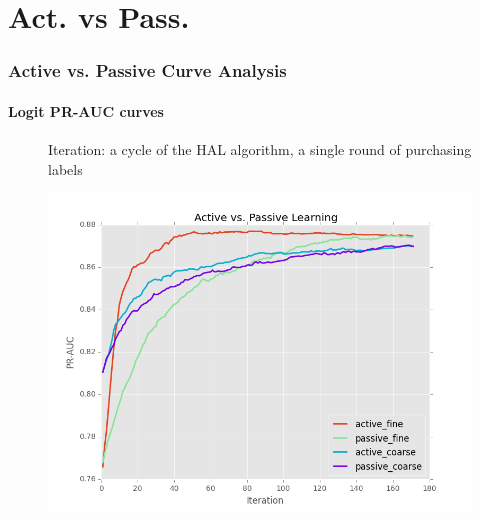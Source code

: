 \documentclass{beamer}
\begin{document}
\section{Act. vs Pass.}
\begin{frame}
    \frametitle{Active vs. Passive Curve Analysis}  %
    \framesubtitle{Logit PR-AUC curves}
    \begin{figure}[!htb]
    \begin{flushleft}
    \par Iteration: a cycle of the HAL algorithm, a single round of purchasing labels
    \end{flushleft}
        \centering
        \includegraphics[width=0.80\columnwidth]{fig/runActPassLogReg_pr}
    \label{fig:runActPassLogReg_pr}
    \end{figure}
\end{frame}
\end{document}
